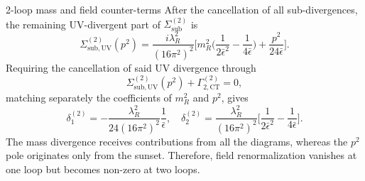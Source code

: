 \documentclass[aspectratio=169,10pt]{beamer}
\newcommand{\bepsilon}{\bar{\epsilon}}
\begin{document}
\begin{frame}{2-loop mass and field counter-terms}
After the cancellation of all sub-divergences, the remaining UV-divergent part of $\Sigma_{\mathrm{sub}}^{(2)}$ is
\begin{equation}
    \Sigma_{\mathrm{sub,UV}}^{(2)}(p^2) = \frac{i\lambda_R^2}{(16\pi^2)^2}\bigg[m_R^2\bigg(\frac{1}{2\bepsilon^2}-\frac{1}{4\bepsilon}\bigg)+\frac{p^2}{24\bepsilon}\bigg].
\end{equation}
Requiring the cancellation of said UV divergence through
\begin{equation}
    \Sigma_{\mathrm{sub,UV}}^{(2)}(p^2) + \Gamma_{2,\mathrm{CT}}^{(2)} = 0,
\end{equation}
matching separately the coefficients of $m_R^2$ and $p^2$, gives
\begin{equation}
\label{eq: counter-term 1 and 2 at 2-loop}
    \delta_1^{(2)} = -\frac{\lambda_R^2}{24(16\pi^2)^2}\frac{1}{\bepsilon},\quad \delta_2^{(2)} = \frac{\lambda_R^2}{(16\pi^2)^2}\bigg[\frac{1}{2\bepsilon^2} - \frac{1}{4\bepsilon}\bigg].
\end{equation}
The mass divergence receives contributions from all the diagrams, whereas the $p^2$ pole originates only from the sunset. Therefore, field renormalization vanishes at one loop but becomes non-zero at two loops.
\end{frame}
\end{document}
